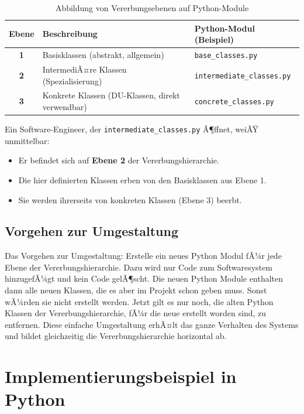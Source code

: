 ﻿\documentclass[a4paper,12pt]{article}
\begin{document}
\begin{table}[h]
	\centering
	\caption{Abbildung von Vererbungsebenen auf Python-Module}
	\label{tab:mapping}
	\begin{tabular}{>{\bfseries}c p{4cm} p{6cm}}
		\toprule
		Ebene & Beschreibung & Python-Modul (Beispiel) \\
		\midrule
		1 & Basisklassen (abstrakt, allgemein) & \texttt{base\_classes.py} \\
		2 & IntermediÃ¤re Klassen (Spezialisierung) & \texttt{intermediate\_classes.py} \\
		3 & Konkrete Klassen (DU-Klassen, direkt verwendbar) & \texttt{concrete\_classes.py} \\
		\bottomrule
	\end{tabular}
\end{table}

Ein Software-Engineer, der \texttt{intermediate\_classes.py} Ã¶ffnet, weiÃŸ unmittelbar:
\begin{itemize}
	\item Er befindet sich auf \textbf{Ebene 2} der Vererbungshierarchie.
	\item Die hier definierten Klassen erben von den Basisklassen aus Ebene 1.
	\item Sie werden ihrerseits von konkreten Klassen (Ebene 3) beerbt.
\end{itemize}

\subsection{Vorgehen zur Umgestaltung}
Das Vorgehen zur Umgestaltung: Erstelle ein neues Python Modul fÃ¼r jede Ebene der Vererbungshierarchie. Dazu wird nur Code zum Softwaresystem hinzugefÃ¼gt und kein Code gelÃ¶scht. Die neuen Python Module enthalten dann alle neuen Klassen, die es aber im Projekt schon geben muss. Sonst wÃ¼rden sie nicht erstellt werden. Jetzt gilt es nur noch, die alten Python Klassen der Vererbungshierarchie, fÃ¼r die neue erstellt worden sind, zu entfernen. Diese einfache Umgestaltung erhÃ¤lt das ganze Verhalten des Systems und bildet gleichzeitig die Vererbungshierarchie horizontal ab.

\section{Implementierungsbeispiel in Python}
\end{document}
